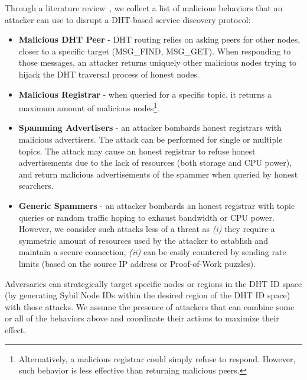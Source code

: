 Through a literature review~\cite{chen2020survey, henningsen2019eclipsing}, we collect a list of malicious behaviors that an attacker can use to disrupt a DHT-based service discovery protocol:
\begin{itemize}
    \item \textbf{Malicious DHT Peer} - DHT routing relies on asking peers for other nodes, closer to a specific target (\eg MSG\_FIND, MSG\_GET).  When responding to those messages, an attacker returns uniquely other malicious nodes trying to hijack the DHT traversal process of honest nodes.
    \item \textbf{Malicious Registrar} - when queried for a specific topic, it returns a maximum amount of malicious nodes\footnote{Alternatively, a malicious registrar could simply refuse to respond. However, such behavior is less effective than returning malicious peers.}. 
    \item \textbf{Spamming Advertisers} - an attacker bombards honest registrars with malicious advertisers.  The attack can be performed for single or multiple topics. The attack may cause an honest registrar to refuse honest advertisements due to the lack of resources (both storage and CPU power), and return malicious advertisements of the spammer when queried by honest searchers. 
    \item \textbf{Generic Spammers} - an attacker bombards an honest registrar with topic queries or random traffic hoping to exhaust bandwidth or CPU power. However, we consider such attacks less of a threat as \textit{(i)} they require a symmetric amount of resources used by the attacker to establish and maintain a secure connection, \textit{(ii)} can be easily countered by sending rate limits (\eg based on the source IP address or Proof-of-Work puzzles). 
\end{itemize}

Adversaries can strategically target specific nodes or regions in the DHT ID space (\ie by generating Sybil Node IDs within the desired region of the DHT ID space) with those attacks. We assume the presence of attackers that can combine some or all of the behaviors above and coordinate their actions to maximize their effect. 

